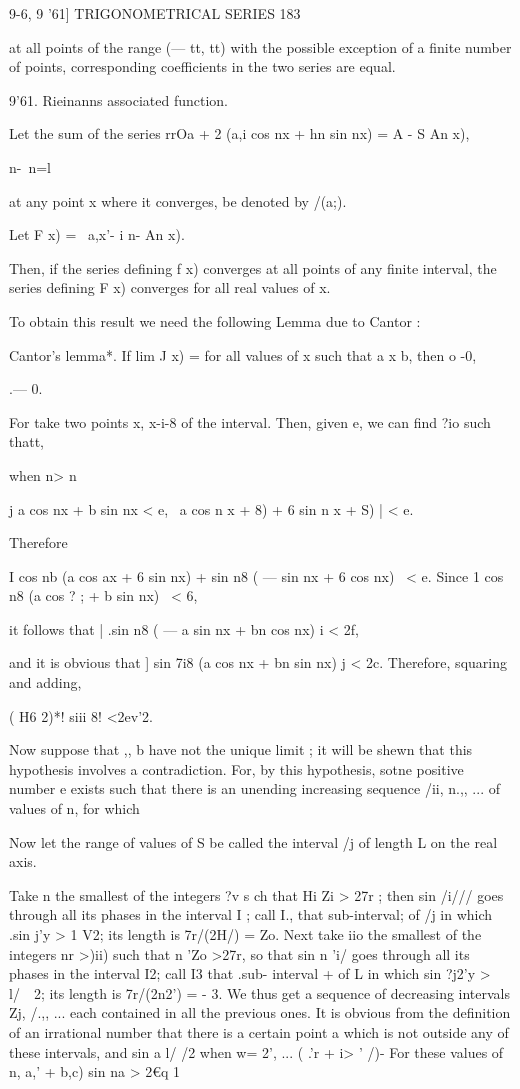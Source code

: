 9-6, 9 '61] TRIGONOMETRICAL SERIES 183 

at all points of the range (— tt, tt) with the possible exception of a finite 
number of points, corresponding coefficients in the two series are equal. 

9'61. Rieinanns associated function. 

Let the sum of the series rrOa + 2 (a,i cos nx + hn sin nx) = A -  S An  x), 

  n-\ n=l 

at any point x where it converges, be denoted by /(a;). 

Let F x) = \ a,x'- i n- An x). 

Then, if the series defining f x) converges at all points of any finite interval, 
the series defining F x) converges for all real values of x. 

To obtain this result we need the following Lemma due to Cantor : 

Cantor's lemma*. If lim J   x) = for all values of x such that a  x  b, then o  -0, 

 .— 0. 

For take two points x, x-i-8 of the interval. Then, given e, we can find ?io such thatt, 

when n> n  

j a  cos nx + b  sin nx < e, \ a  cos n  x + 8) + 6  sin n  x + S) | < e. 

Therefore 

I cos nb (a  cos ax + 6  sin nx) + sin n8 ( —    sin nx + 6  cos nx) \ < e. 
Since 1 cos n8 (a  cos ? ; + b  sin nx) \ < 6, 

it follows that | .sin n8 ( — a  sin nx + bn cos nx) i < 2f, 

and it is obvious that ] sin 7i8 (a  cos nx + bn sin nx) j < 2c. 
Therefore, squaring and adding, 

(  H6 2)*! siii 8! <2ev'2. 

Now suppose that   ,, b  have not the unique limit ; it will be shewn that this 
hypothesis involves a contradiction. For, by this hypothesis, sotne positive number e  
exists such that there is an unending increasing sequence /ii, n.,, ... of values of n, for 
which 

Now let the range of values of S be called the interval /j of length L  on the real axis. 

Take n  the smallest of the integers ?v s ch that Hi Zi > 27r ; then sin /i/// goes through 
all its phases in the interval I  ; call I., that sub-interval; of /j in which .sin  j'y > 1 V2; 
its length is 7r/(2H/) = Zo. Next take iio the smallest of the integers nr >)ii) such that 
n 'Zo >27r, so that sin n 'i/ goes through all its phases in the interval I2; call I3 that .sub- 
interval + of L in which sin ?j2'y > l/\ \  2; its length is 7r/(2n2') = - 3. We thus get a 
sequence of decreasing intervals Zj, /.,, ... each contained in all the previous ones. It is 
obvious from the definition of an irrational number that there is a certain point a which 
is not outside any of these intervals, and sin  a l/ /2 when w=    2', ... ( .'r + i> ' /)- 
For these values of n,  a,'  + b,c)   sin na > 2€q  1%

